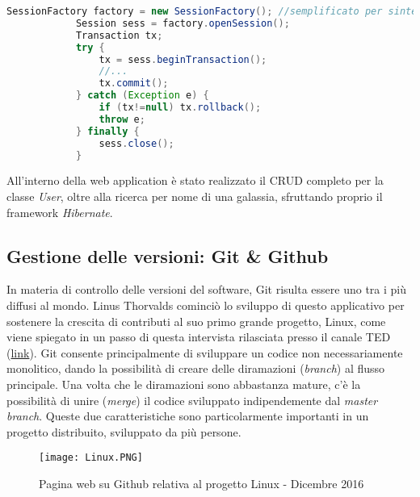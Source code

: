 \documentclass[12pt,a4paper,onecolumn,x11names]{article}
\begin{document}
\begin{flushleft}
\begin{lstlisting}[language=java, caption=Utilizzo di SessionFactory]
			SessionFactory factory = new SessionFactory(); //semplificato per sintesi
			Session sess = factory.openSession();
			Transaction tx;
			try {
				tx = sess.beginTransaction();
				//...
				tx.commit();
			} catch (Exception e) {
				if (tx!=null) tx.rollback();
				throw e;
			} finally {
				sess.close();
			}
		\end{lstlisting}
		\begin{flushleft}
			All'interno della web application è stato realizzato il CRUD completo per la classe \textit{User}, oltre alla ricerca per nome di una galassia, sfruttando proprio il framework \textit{Hibernate}.
		\end{flushleft} 
	\end{flushleft}
	
	\subsection{Gestione delle versioni: Git \& Github}
		\begin{flushleft}
			In materia di controllo delle versioni del software, Git risulta essere uno tra i più diffusi al mondo. Linus Thorvalds cominciò lo sviluppo di questo applicativo per sostenere la crescita di contributi al suo primo grande progetto, Linux, come viene spiegato in un passo di questa intervista rilasciata presso il canale TED (\textsf{\href{http://www.ted.com/talks/linus_torvalds_the_mind_behind_linux}{link}}).\newline
			Git consente principalmente di sviluppare un codice non necessariamente monolitico, dando la possibilità di creare delle diramazioni (\textit{branch}) al flusso principale. Una volta che le diramazioni sono abbastanza mature, c'è la possibilità di unire (\textit{merge}) il codice sviluppato indipendemente dal \textit{master branch}. 
			Queste due caratteristiche sono particolarmente importanti in un progetto distribuito, sviluppato da più persone. 
		\end{flushleft}
	\begin{center}
		\begin{figure}[h]
			\texttt{[image: Linux.PNG]}
			\caption{Pagina web su Github relativa al progetto Linux - Dicembre 2016}
		\end{figure}
	\end{center}
\end{document}
